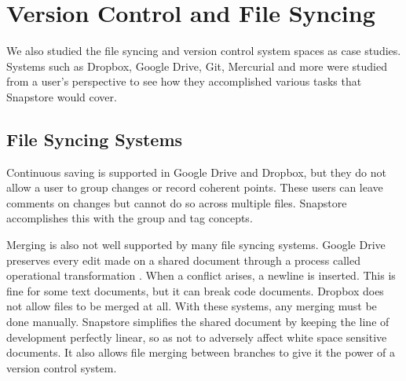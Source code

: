 


\section{Version Control and File Syncing}

We also studied the file syncing and version control system spaces as case studies. Systems such as Dropbox, Google Drive, Git, Mercurial and more were studied from a user's perspective to see how they accomplished various tasks that Snapstore would cover.

\subsection{File Syncing Systems}

Continuous saving is supported in Google Drive and Dropbox, but they do not allow a user to group changes or record coherent points. These users can leave comments on changes but cannot do so across multiple files. Snapstore accomplishes this with the group and tag concepts.

Merging is also not well supported by many file syncing systems. Google Drive preserves every edit made on a shared document through a process called operational transformation \cite{Xu}. When a conflict arises, a newline is inserted. This is fine for some text documents, but it can break code documents. Dropbox does not allow files to be merged at all. With these systems, any merging must be done manually. Snapstore simplifies the shared document by keeping the line of development perfectly linear, so as not to adversely affect white space sensitive documents. It also allows file merging between branches to give it the power of a version control system.

